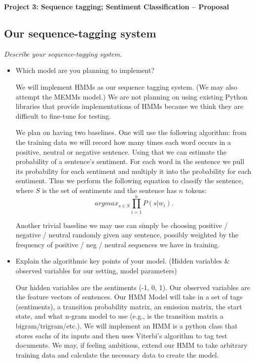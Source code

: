 \documentclass{article}
\begin{document}
\begin{center}\textbf{Project 3: Sequence tagging; Sentiment Classification -- Proposal}\end{center}

\subsection*{Our sequence-tagging system}

\textit{Describe your sequence-tagging system.}\par

\begin{itemize}
\item Which model are you planning to implement?\par

We will implement HMMs as our sequence tagging system. (We may also attempt the MEMMs model.) We are not planning on using existing Python libraries that provide implementations of HMMs because we think they are difficult to fine-tune for testing.

We plan on having two baselines. One will use the following algorithm: from the training data we will record how many times each word occurs in a positive, neutral or negative sentence. Using that we can estimate the probability of a sentence's sentiment. For each word in the sentence we pull its probability for each sentiment and multiply it into the probability for each sentiment. Thus we perform the following equation to classify the sentence, where $S$ is the set of sentiments and the sentence has $n$ tokens:
\[argmax_{s \in S}{\prod_{i=1}^n} P(s|w_i).\]

Another trivial baseline we may use can simply be choosing positive / negative / neutral randomly given any sentence, possibly weighted by the frequency of positive / neg / neutral sequences we have in training.

\item Explain the algorithmic key points of your model. (Hidden variables \& observed variables for our setting, model parameters)\par

Our hidden variables are the sentiments (-1, 0, 1). Our observed variables are the feature vectors of sentences. Our HMM Model will take in a set of tags (sentiments), a transition probability matrix, an emission matrix, the start state, and what n-gram model to use (e.g., is the transition matrix a bigram/trigram/etc.). We will implement an HMM is a python class that stores eachs of its inputs and then uses Viterbi's algorithm to tag test documents. We may, if feeling ambitious, extend our HMM to take arbitrary training data and calculate the necessary data to create the model.


\end{itemize}
\end{document}
